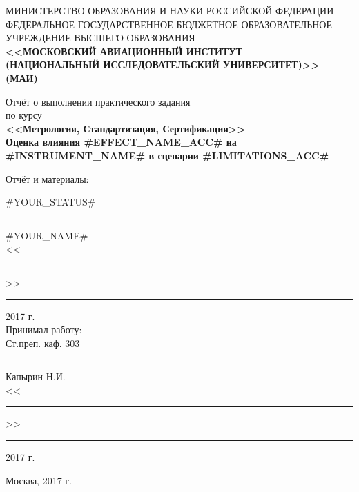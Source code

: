 \documentclass[12pt]{article}   %
\begin{document}
\thispagestyle{empty}
\begin{center}

{\scriptsize
МИНИСТЕРСТВО ОБРАЗОВАНИЯ И НАУКИ РОССИЙСКОЙ ФЕДЕРАЦИИ\\[.2cm]

ФЕДЕРАЛЬНОЕ ГОСУДАРСТВЕННОЕ БЮДЖЕТНОЕ ОБРАЗОВАТЕЛЬНОЕ\\[.2cm]

УЧРЕЖДЕНИЕ ВЫСШЕГО ОБРАЗОВАНИЯ\\[.2cm]

\textbf{<<МОСКОВСКИЙ АВИАЦИОННЫЙ ИНСТИТУТ}\\[.2cm]

\textbf{(НАЦИОНАЛЬНЫЙ ИССЛЕДОВАТЕЛЬСКИЙ УНИВЕРСИТЕТ)>> (МАИ)}\\[.2cm]
}

\vfill
{\large
Отчёт о выполнении практического задания\\
по курсу\\
\textbf{<<Метрология, Стандартизация, Сертификация>>}\\[0.4cm]
\bfseries Оценка влияния #EFFECT_NAME_ACC# на #INSTRUMENT_NAME# в сценарии #LIMITATIONS_ACC#\\[2cm]}

\vfill

\begin{minipage}[t]{0.3\textwidth}
	\begin{flushleft}
    Отчёт и материалы:\\\bigskip
    \end{flushleft}
\end{minipage}%
\begin{minipage}[t]{0.7\textwidth}
    \begin{flushright}
	#YOUR_STATUS#\\[.4cm]
	\rule{4cm}{1pt} #YOUR_NAME#\\
	<<\rule{.8cm}{1pt}>> \rule{3cm}{1pt} 2017 г.\\\bigskip
	Принимал работу:\\
	Ст.преп. каф. 303\\[.4cm]
	\rule{4cm}{1pt} Капырин Н.И.\\
	<<\rule{.8cm}{1pt}>> \rule{3cm}{1pt} 2017 г.
    \end{flushright}
\end{minipage}

\vfill

{\large Москва, 2017 г.}
\end{center}
\end{document}
